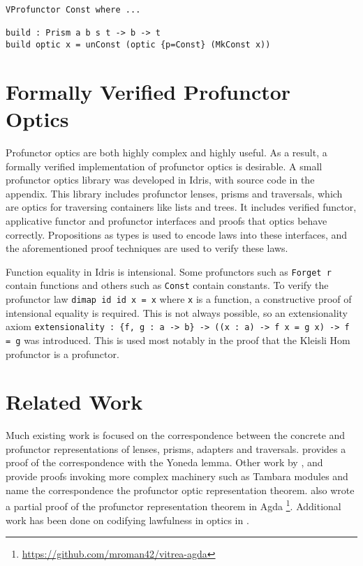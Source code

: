 \documentclass[11pt]{report}
\begin{document}
\begin{spacing}{1.15}
\begin{verbatim}
VProfunctor Const where ...

build : Prism a b s t -> b -> t
build optic x = unConst (optic {p=Const} (MkConst x))
\end{verbatim}

\section{Formally Verified Profunctor Optics}

Profunctor optics are both highly complex and highly useful. As a result, a formally verified implementation of profunctor optics is desirable. A small profunctor optics library was developed in Idris, with source code in the appendix. This library includes profunctor lenses, prisms and traversals, which are optics for traversing containers like lists and trees. It includes verified functor, applicative functor and profunctor interfaces and proofs that optics behave correctly. Propositions as types is used to encode laws into these interfaces, and the aforementioned proof techniques are used to verify these laws.

Function equality in Idris is intensional. Some profunctors such as \texttt{Forget r} contain functions and others such as \texttt{Const} contain constants. To verify the profunctor law \texttt{dimap id id x = x} where \texttt{x} is a function, a constructive proof of intensional equality is required. This is not always possible, so an extensionality axiom \texttt{extensionality : \{f, g : a -> b\} -> ((x : a) -> f x = g x) -> f = g} was introduced. This is used most notably in the proof that the Kleisli Hom profunctor is a profunctor.

\section{Related Work}

Much existing work is focused on the correspondence between the concrete and profunctor representations of lenses, prisms, adapters and traversals. \cite{boisseau2018yoneda} provides a proof of the correspondence with the Yoneda lemma. Other work by \cite{milewski2017profunctor}, \cite{roman2020profunctor} and \cite{boisseau2018understanding} provide proofs invoking more complex machinery such as Tambara modules and name the correspondence the profunctor optic representation theorem. \cite{roman2020profunctor} also wrote a partial proof of the profunctor representation theorem in Agda \footnote{\href{https://github.com/mroman42/vitrea-agda}{https://github.com/mroman42/vitrea-agda}}. Additional work has been done on codifying lawfulness in optics in \cite{riley2018categories}.


\end{spacing}
\end{document}

